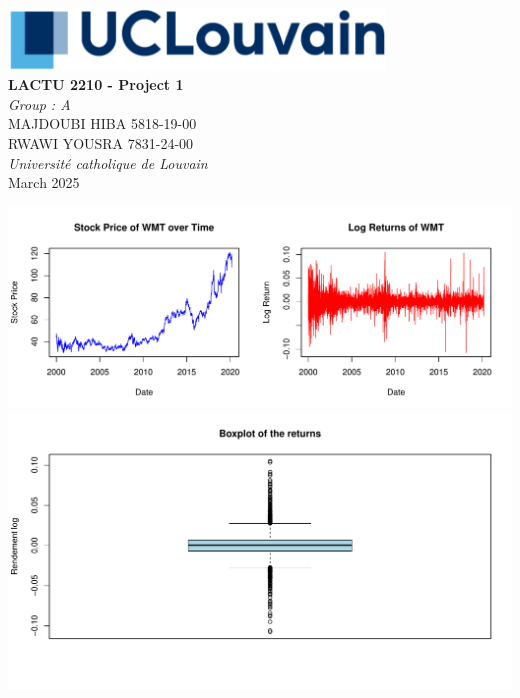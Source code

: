 \documentclass[
  12pt,
]{article}
\author{}
\date{\vspace{-2.5em}}
\begin{document}
\begin{titlepage}
\begin{center}
\vspace*{3cm}
\includegraphics[width=10cm]{UCL.png} \\[5cm]

\textbf{\LARGE LACTU 2210 - Project 1} \\[2cm]
\textit{\LARGE Group : A}\\


\vfill
\large
MAJDOUBI HIBA  5818-19-00 \\
RWAWI YOUSRA 7831-24-00 \\[1cm]
\textit{Université catholique de Louvain} \\[2cm]
March 2025


\end{center}
\end{titlepage}

\newpage

\newpage

\includegraphics{QRM_files/figure-latex/unnamed-chunk-3-1.pdf}
\includegraphics{QRM_files/figure-latex/unnamed-chunk-4-1.pdf}
\end{document}
